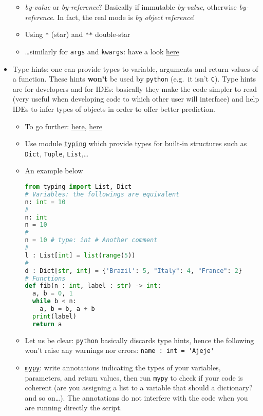 \documentclass[a4paper,12pt,%
              final%
              ]{article}
\begin{document}
\begin{itemize}
    \begin{itemize}
      \item \emph{by-value} or \emph{by-reference}? Basically if immutable \emph{by-value}, otherwise \emph{by-reference}. In fact, the real mode is \emph{by object reference}!
      \item Using \texttt{*} (star) and \texttt{**} double-star
      \item \ldots{}similarly for \texttt{args} and \texttt{kwargs}: have a look \href{https://realpython.com/python-kwargs-and-args/}{here}
    \end{itemize}
  \item Type hints: one can provide types to variable, arguments and return values of a function. These hints \textbf{won't} be used by \texttt{python} (e.g.~it isn't \texttt{C}). Type hints are for developers and for IDEs: basically they make the code simpler to read (very useful when developing code to which other user will interface) and help IDEs to infer types of objects in order to offer better prediction.
    \begin{itemize}
      \item To go further: \href{https://stackoverflow.com/a/32558710}{here}, \href{https://www.infoworld.com/article/3630372/get-started-with-python-type-hints.html}{here}
      \item Use module \href{https://docs.python.org/3/library/typing.html}{\texttt{typing}} which provide types for built-in structures such as \texttt{Dict}, \texttt{Tuple}, \texttt{List},\ldots
      \item An example below
\begin{lstlisting}[language=python]
from typing import List, Dict
# Variables: the followings are equivalent
n: int = 10
#
n: int
n = 10
#
n = 10 # type: int # Another comment
#
l : List[int] = list(range(5))
#
d : Dict[str, int] = {'Brazil': 5, "Italy": 4, "France": 2}
# Functions
def fib(n : int, label : str) -> int:
  a, b = 0, 1
  while b < n:
    a, b = b, a + b
  print(label)
  return a
\end{lstlisting}
      \item Let us be clear: \texttt{python} basically discards type hints, hence the following won't raise any warnings nor errors: \verb|name : int = 'Ajeje'|
      \item \href{https://mypy.readthedocs.io/en/stable/index.html}{\texttt{mypy}}: write annotations indicating the types of your variables, parameters, and return values, then run \texttt{mypy} to check if your code is coherent (are you assigning a list to a variable that should a dictionary? and so on\ldots). The annotations do not interfere with the code when you are running directly the script.

\end{itemize}
\end{itemize}
\end{document}
